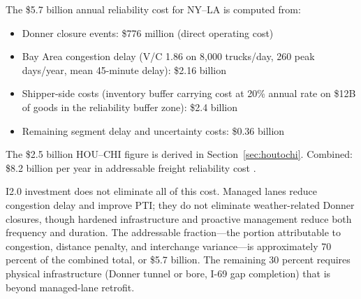 The \$5.7 billion annual reliability cost for NY--LA is computed from:
\begin{itemize}
  \item Donner closure events: \$776 million (direct operating cost)
  \item Bay Area congestion delay (V/C 1.86 on 8,000 trucks/day, 260 peak days/year, mean 45-minute delay): \$2.16 billion
  \item Shipper-side costs (inventory buffer carrying cost at 20\% annual rate on \$12B of goods in the reliability buffer zone): \$2.4 billion
  \item Remaining segment delay and uncertainty costs: \$0.36 billion
\end{itemize}
The \$2.5 billion HOU--CHI figure is derived in Section~\ref{sec:houtochi}. Combined: \$8.2 billion per year in addressable freight reliability cost \citep{ATRI_costs2024}.

I2.0 investment does not eliminate all of this cost. Managed lanes reduce congestion delay and improve PTI; they do not eliminate weather-related Donner closures, though hardened infrastructure and proactive management reduce both frequency and duration. The addressable fraction---the portion attributable to congestion, distance penalty, and interchange variance---is approximately 70 percent of the combined total, or \$5.7 billion. The remaining 30 percent requires physical infrastructure (Donner tunnel or bore, I-69 gap completion) that is beyond managed-lane retrofit.
